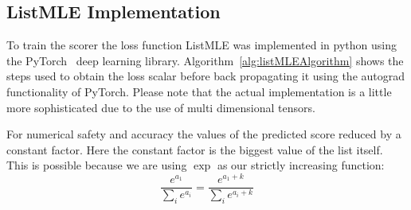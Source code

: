 \documentclass[12pt, twoside, ngerman]{report}
\begin{document}

\subsection{ListMLE Implementation}

To train the scorer the loss function ListMLE was implemented in python using the PyTorch~\cite{PyTorch} deep learning library.
Algorithm~\ref{alg:listMLEAlgorithm} shows the steps used to obtain the loss scalar before back propagating it using the autograd functionality of PyTorch.
Please note that the actual implementation is a little more sophisticated due to the use of multi dimensional tensors.

For numerical safety and accuracy the values of the predicted score reduced by a constant factor.  Here the constant factor is the biggest value of the list itself.
This is possible because we are using $\exp$ as our strictly increasing function:
$$
\frac{e^{a_1}}{\sum\limits_{i} e^{a_i}} = \frac{e^{a_1 + k}}{\sum\limits_{i} e^{a_i + k}} 
$$
\end{document}
